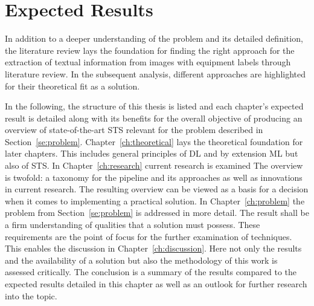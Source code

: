\section{Expected Results}
In addition to a deeper understanding of the problem and its detailed definition, the literature
review lays the foundation for finding the right approach for the extraction of textual
information from images with equipment labels through literature review.
In the subsequent analysis, different approaches are highlighted for their theoretical fit as a
solution.

In the following, the structure of this thesis is listed and each chapter's expected
result is detailed along with its benefits for the overall objective of producing an overview of
state-of-the-art \ac{STS} relevant for the problem described in Section~\ref{se:problem}.
Chapter~\ref{ch:theoretical} lays the theoretical foundation for later chapters.
This includes general principles of \ac{DL} and by extension \ac{ML} but also of \ac{STS}.
In Chapter~\ref{ch:research} current research is examined
The overview is twofold: a taxonomy for the pipeline and its approaches as well as innovations in
current research.
The resulting overview can be viewed as a basis for a decision when it comes to implementing a
practical solution.
In Chapter~\ref{ch:problem} the problem from Section~\ref{se:problem} is addressed in more detail.
The result shall be a firm understanding of qualities that a solution must possess.
These requirements are the point of focus for the further examination of techniques.
This enables the discussion in Chapter~\ref{ch:discussion}.
Here not only the results and the availability of a solution but also the methodology of this work
is assessed critically.
The conclusion is a summary of the results compared to the expected results detailed in this chapter
as well as an outlook for further research into the topic.
